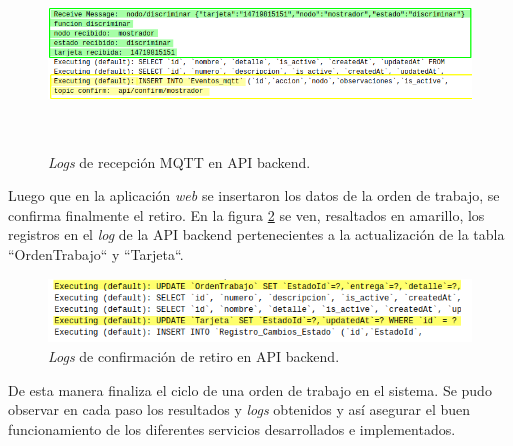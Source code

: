 \begin{figure}[H]
	\centering
	\includegraphics[width=\textwidth, height=5cm]{./Figures/ensayo-1/22.retirar-api-evento.png}
	\caption{\textit{Logs} de recepción MQTT en API backend.}
	\label{fig:ensayoretirarapievento}
\end{figure}

Luego que en la aplicación \textit{web} se insertaron los datos de la orden de trabajo, se confirma finalmente el retiro. En la figura \ref{fig:ensayoretirarconfirmacionapi} se ven, resaltados en amarillo, los registros en el \textit{log} de la API backend pertenecientes a la actualización de la tabla ``OrdenTrabajo`` y ``Tarjeta``. 
 
\begin{figure}[H]
	\centering
	\includegraphics[width=\textwidth]{./Figures/ensayo-1/24.retirar-confirmacion-api.png}
	\caption{\textit{Logs} de confirmación de retiro en API backend.}
	\label{fig:ensayoretirarconfirmacionapi}
\end{figure}

De esta manera finaliza el ciclo de una orden de trabajo en el sistema. Se pudo observar en cada paso los resultados y \textit{logs} obtenidos y así asegurar el buen funcionamiento de los diferentes servicios desarrollados e implementados.




